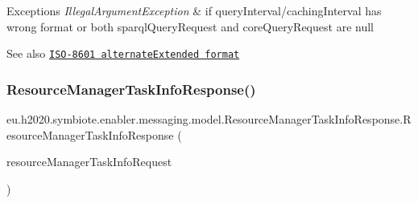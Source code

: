 \begin{DoxyExceptions}{Exceptions}
{\em Illegal\+Argument\+Exception} & if query\+Interval/caching\+Interval has wrong format or both sparql\+Query\+Request and core\+Query\+Request are null \\
\hline
\end{DoxyExceptions}
\begin{DoxySeeAlso}{See also}
\href{http://joda-time.sourceforge.net/apidocs/org/joda/time/format/ISOPeriodFormat.html#alternateExtended()}{\tt I\+S\+O-\/8601 alternate\+Extended format} 
\end{DoxySeeAlso}
\mbox{\label{classeu_1_1h2020_1_1symbiote_1_1enabler_1_1messaging_1_1model_1_1ResourceManagerTaskInfoResponse_a4f61f4967c69715130c72c37c2299e07}} 
\subsubsection{\texorpdfstring{Resource\+Manager\+Task\+Info\+Response()}{ResourceManagerTaskInfoResponse()}\hspace{0.1cm}{\footnotesize\ttfamily [3/4]}}
{\footnotesize\ttfamily eu.\+h2020.\+symbiote.\+enabler.\+messaging.\+model.\+Resource\+Manager\+Task\+Info\+Response.\+Resource\+Manager\+Task\+Info\+Response (\begin{DoxyParamCaption}\item[{\hyperlink{classeu_1_1h2020_1_1symbiote_1_1enabler_1_1messaging_1_1model_1_1ResourceManagerTaskInfoRequest}{Resource\+Manager\+Task\+Info\+Request}}]{resource\+Manager\+Task\+Info\+Request }\end{DoxyParamCaption})}


